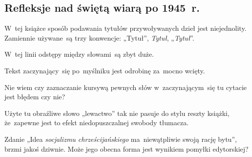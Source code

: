 \documentclass[a4paper,11pt]{article}
\begin{document}
\vspace{\spaceTwo}










\newpage
\subsection{Refleksje nad świętą wiarą po 1945~r.}

\vspace{\spaceThree}


{}



\start W~tej książce sposób podawania tytułów przywoływanych dzieł
jest niejednolity. Zamiennie używane~są trzy konwencje: „Tytuł”,
\emph{Tytuł}, „\emph{Tytuł}”.

\vspace{\spaceFour}


\start {} W~tej linii odstępy między słowami~są zbyt
duże.

\vspace{\spaceFour}


\start {} Tekst zaczynający~się po~myślniku jest odrobinę
za~mocno wcięty.

\vspace{\spaceFour}


\start {} Nie wiem czy zaznaczanie kursywą pewnych słów
w~zaczynającym~się tu cytacie jest błędem czy nie?

\vspace{\spaceFour}


\start {} Użyte tu obraźliwe słowo „lewactwo” tak nie
pasuje do stylu reszty książki, że~zapewne jest to efekt
niedopuszczalnej swobody tłumacza.

\vspace{\spaceFour}


\start {} Zdanie „Idea \emph{socjalizmu
  chrześcijańskiego} ma~niewątpliwie swoją rację bytu”, brzmi jakoś
dziwnie. Może jego obecna forma jest wynikiem pomyłki edytorskiej?

\vspace{\spaceFour}
\end{document}
